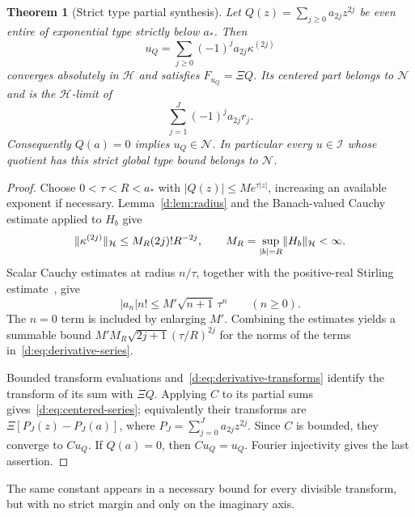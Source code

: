 \documentclass[11pt,a4paper]{article}
\numberwithin{equation}{section}
\newtheorem{theorem}{Theorem}[section]
\theoremstyle{definition}\newtheorem{definition}[theorem]{Definition}
\theoremstyle{remark}\newtheorem{remark}[theorem]{Remark}
\newcommand{\Hh}{\mathcal H}\newcommand{\Hw}{\mathcal H}
\newcommand{\Nn}{\mathcal N}\newcommand{\Ii}{\mathcal I}\newcommand{\Zz}{\mathcal Z}
\begin{document}
\begin{theorem}[Strict type partial synthesis]\label{d:thm:type}
Let $Q(z)=\sum_{j\ge0}a_{2j}z^{2j}$ be even entire of exponential type strictly below $a_*$. Then
\begin{equation}\label{d:eq:derivative-series}
 u_Q=\sum_{j\ge0}(-1)^j a_{2j}\kappa^{(2j)}
\end{equation}
converges absolutely in $\Hh$ and satisfies $F_{u_Q}=\Xi Q$. Its centered part belongs to $\Nn$ and is the $\Hh$-limit of
\begin{equation}\label{d:eq:centered-series}
 \sum_{j=1}^J(-1)^j a_{2j}r_j.
\end{equation}
Consequently $Q(a)=0$ implies $u_Q\in\Nn$. In particular every $u\in\Ii$ whose quotient has this strict global type bound belongs to $\Nn$.
\end{theorem}
\begin{proof}
Choose $0<\tau<R<a_*$ with $|Q(z)|\le M e^{\tau|z|}$, increasing an available exponent if necessary. Lemma~\ref{d:lem:radius} and the Banach-valued Cauchy estimate applied to $H_b$ give
\begin{equation}\label{d:eq:Banach-Cauchy}
 \norm{\kappa^{(2j)}}_{\Hh}\le M_R(2j)!R^{-2j},\qquad
 M_R=\sup_{|b|=R}\norm{H_b}_{\Hh}<\infty.
\end{equation}
Scalar Cauchy estimates at radius $n/\tau$, together with the positive-real Stirling estimate~\cite[\S5.11]{DLMF}, give
\begin{equation}\label{d:eq:scalar-Cauchy}
 |a_n|n!\le M'\sqrt{n+1}\,\tau^n\qquad(n\ge0).
\end{equation}
The $n=0$ term is included by enlarging $M'$. Combining the estimates yields a summable bound
$M'M_R\sqrt{2j+1}(\tau/R)^{2j}$ for the norms of the terms in~\eqref{d:eq:derivative-series}.

Bounded transform evaluations and~\eqref{d:eq:derivative-transforms} identify the transform of its sum with $\Xi Q$. Applying $C$ to its partial sums gives~\eqref{d:eq:centered-series}; equivalently their transforms are
$\Xi[P_J(z)-P_J(a)]$, where $P_J=\sum_{j=0}^J a_{2j}z^{2j}$. Since $C$ is bounded, they converge to $Cu_Q$. If $Q(a)=0$, then $Cu_Q=u_Q$. Fourier injectivity gives the last assertion.
\end{proof}

The same constant appears in a necessary bound for every divisible transform, but with no strict margin and only on the imaginary axis.
\end{document}
